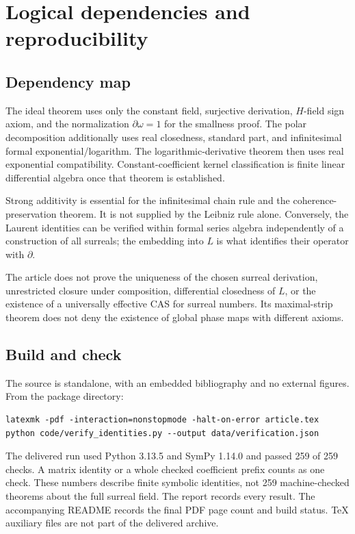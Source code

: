 \documentclass[11pt]{article}
\numberwithin{equation}{section}
\theoremstyle{definition}
\newcommand{\DD}{\partial}
\begin{document}
\section{Logical dependencies and reproducibility}
\label{app:dependencies}

\subsection{Dependency map}
The ideal theorem uses only the constant field, surjective derivation,
$H$-field sign axiom, and the normalization $\DD\omega=1$ for the
smallness proof. The polar decomposition additionally uses real
closedness, standard part, and infinitesimal formal exponential/logarithm.
The logarithmic-derivative theorem then uses real exponential
compatibility. Constant-coefficient kernel classification is finite
linear differential algebra once that theorem is established.

Strong additivity is essential for the infinitesimal chain rule and the
coherence-preservation theorem. It is not supplied by the Leibniz rule
alone. Conversely, the Laurent identities can be verified within formal
series algebra independently of a construction of all surreals; the
embedding into $L$ is what identifies their operator with $\DD$.

The article does not prove the uniqueness of the chosen surreal
derivation, unrestricted closure under composition, differential
closedness of $L$, or the existence of a universally effective CAS for
surreal numbers. Its maximal-strip theorem does not deny the existence
of global phase maps with different axioms.

\subsection{Build and check}
The source is standalone, with an embedded bibliography and no external
figures. From the package directory:
\begin{verbatim}
latexmk -pdf -interaction=nonstopmode -halt-on-error article.tex
python code/verify_identities.py --output data/verification.json
\end{verbatim}
The delivered run used Python 3.13.5 and SymPy 1.14.0 and passed
259 of 259 checks. A matrix identity or a whole checked coefficient
prefix counts as one check. These numbers describe finite symbolic
identities, not 259 machine-checked theorems about the full surreal field.
The report records every result. The accompanying README records the
final PDF page count and build status. TeX auxiliary files are not part
of the delivered archive.
\end{document}
